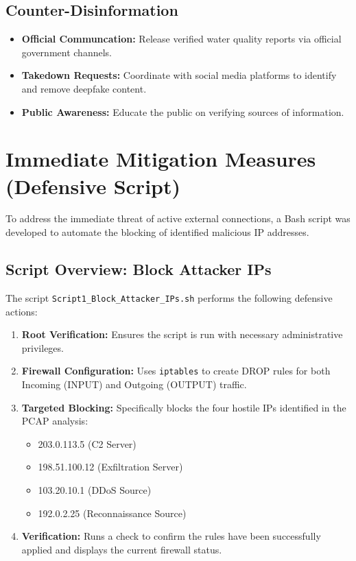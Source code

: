 \documentclass[12pt,a4paper]{article}
\begin{document}
\subsection{Counter-Disinformation}
\begin{itemize}
    \item \textbf{Official Communcation:} Release verified water quality reports via official government channels.
    \item \textbf{Takedown Requests:} Coordinate with social media platforms to identify and remove deepfake content.
    \item \textbf{Public Awareness:} Educate the public on verifying sources of information.
\end{itemize}

\section{Immediate Mitigation Measures (Defensive Script)}
To address the immediate threat of active external connections, a Bash script was developed to automate the blocking of identified malicious IP addresses.

\subsection{Script Overview: Block Attacker IPs}
The script \texttt{Script1\_Block\_Attacker\_IPs.sh} performs the following defensive actions:
\begin{enumerate}
    \item \textbf{Root Verification:} Ensures the script is run with necessary administrative privileges.
    \item \textbf{Firewall Configuration:} Uses \texttt{iptables} to create DROP rules for both Incoming (INPUT) and Outgoing (OUTPUT) traffic.
    \item \textbf{Targeted Blocking:} Specifically blocks the four hostile IPs identified in the PCAP analysis:
    \begin{itemize}
        \item 203.0.113.5 (C2 Server)
        \item 198.51.100.12 (Exfiltration Server)
        \item 103.20.10.1 (DDoS Source)
        \item 192.0.2.25 (Reconnaissance Source)
    \end{itemize}
    \item \textbf{Verification:} Runs a check to confirm the rules have been successfully applied and displays the current firewall status.
\end{enumerate}
\end{document}
